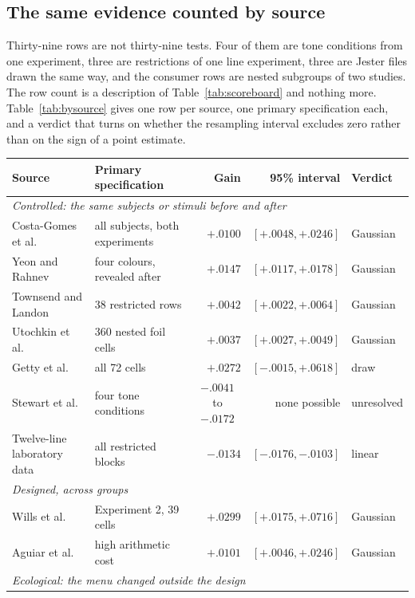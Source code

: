\documentclass[11pt]{article}
\theoremstyle{italichead}
\begin{document}
\subsection{The same evidence counted by source}
\label{sec:bysource}

Thirty-nine rows are not thirty-nine tests. Four of them are tone conditions from one
experiment, three are restrictions of one line experiment, three are Jester files drawn the same
way, and the consumer rows are nested subgroups of two studies. The row count is a description of
Table~\ref{tab:scoreboard} and nothing more. Table~\ref{tab:bysource} gives one row per source,
one primary specification each, and a verdict that turns on whether the resampling interval
excludes zero rather than on the sign of a point estimate.

\begin{table}[htbp]
\centering
\footnotesize
\setlength{\tabcolsep}{4pt}
\begin{tabular}{llrrl}
\toprule
Source & Primary specification & Gain & 95\% interval & Verdict \\
\midrule
\multicolumn{5}{l}{\emph{Controlled: the same subjects or stimuli before and after}} \\
Costa-Gomes et al. & all subjects, both experiments & $+.0100$ & $[+.0048, +.0246]$ & Gaussian \\
Yeon and Rahnev & four colours, revealed after & $+.0147$ & $[+.0117, +.0178]$ & Gaussian \\
Townsend and Landon & 38 restricted rows & $+.0042$ & $[+.0022, +.0064]$ & Gaussian \\
Utochkin et al. & 360 nested foil cells & $+.0037$ & $[+.0027, +.0049]$ & Gaussian \\
Getty et al. & all 72 cells & $+.0272$ & $[-.0015, +.0618]$ & draw \\
Stewart et al. & four tone conditions & \multicolumn{1}{c}{$-.0041$ to $-.0172$} & none possible & unresolved \\
Twelve-line laboratory data & all restricted blocks & $-.0134$ & $[-.0176, -.0103]$ & linear \\
\midrule
\multicolumn{5}{l}{\emph{Designed, across groups}} \\
Wills et al. & Experiment 2, 39 cells & $+.0299$ & $[+.0175, +.0716]$ & Gaussian \\
Aguiar et al. & high arithmetic cost & $+.0101$ & $[+.0046, +.0246]$ & Gaussian\footnotemark[5] \\
\midrule
\multicolumn{5}{l}{\emph{Ecological: the menu changed outside the design}} \\

\end{tabular}
\end{table}
\end{document}
